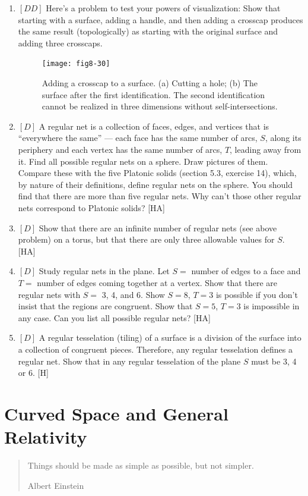 \documentclass{book}
\begin{document}
\begin{enumerate}
\item $[DD]$ Here's a problem to test your powers of visualization: Show
that starting with a surface, adding a handle, and then adding a crosscap
produces the same result (topologically) as starting with the original
surface and adding three crosscaps.

\begin{figure}
\begin{center}
\texttt{[image: fig8-30]}
\caption{Adding a crosscap to a surface. (a) Cutting a hole; (b) The surface after the first identification. The second identification cannot be realized in three dimensions without self-intersections.}
\end{center}
\end{figure}

\item $[D]$ A regular net is a collection of faces, edges, and vertices that
is ``everywhere the same'' --- each face has the same number of arcs, $S$,
along its periphery and each vertex has the same number of arcs, $T$,
leading away from it. Find all possible regular nets on a sphere. Draw
pictures of them. Compare these with the five Platonic solids (section
5.3, exercise 14), which, by nature of their definitions, define regular nets
on the sphere. You should find that there are more than five regular
nets. Why can't those other regular nets correspond to Platonic solids?
[HA]

\item $[D]$ Show that there are an infinite number of regular nets (see above
problem) on a torus, but that there are only three allowable values for
$S$. [HA]

\item $[D]$ Study regular nets in the plane. Let $S =$ number of edges to a
face and $T =$ number of edges coming together at a vertex. Show that
there are regular nets with $S =$ 3, 4, and 6. Show $S = 8$, $T = 3$ is
possible if you don't insist that the regions are congruent. Show that
$S = 5$, $T = 3$ is impossible in any case. Can you list all possible regular
nets? [HA]

\item $[D]$ A regular tesselation (tiling) of a surface is a division of the
surface into a collection of congruent pieces. Therefore, any regular
tesselation defines a regular net. Show that in any regular tesselation of
the plane $S$ must be 3, 4 or 6. [H]
\end{enumerate}

\chapter{Curved Space and General Relativity}
\begin{quote}
Things should be made as simple as possible, but
not simpler.

Albert Einstein
\end{quote}
\end{document}
